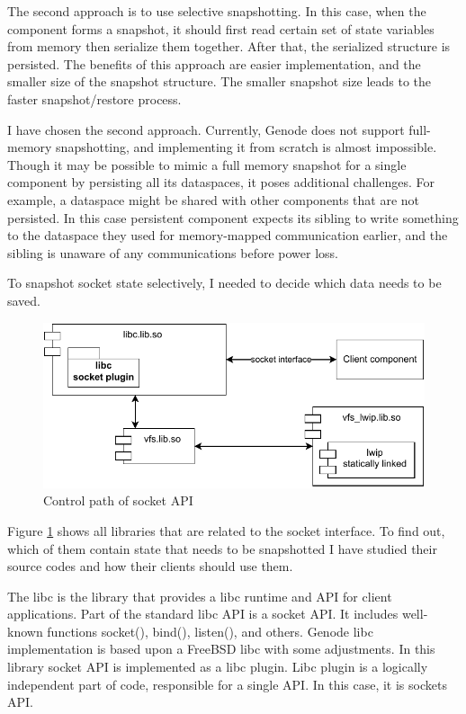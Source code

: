 The second approach is to use selective snapshotting. In this case, when the
component forms a snapshot, it should first read certain set of state variables
from memory then serialize them together. After that, the serialized structure
is persisted. The benefits of this approach are easier implementation, and the
smaller size of the snapshot structure. The smaller snapshot size leads to the faster
snapshot/restore process.

I have chosen the second approach. Currently, Genode does not support
full-memory snapshotting, and implementing it from scratch is almost
impossible. Though it may be possible to mimic a full memory snapshot for a
single component by persisting all its dataspaces, it poses additional
challenges. For example, a dataspace might be shared with other components that
are not persisted. In this case persistent component expects its sibling to
write something to the dataspace they used for memory-mapped communication
earlier, and the sibling is unaware of any communications before power loss.

To snapshot socket state selectively, I needed to decide which data needs
to be saved. 

\begin{figure}
    \centering
    \includegraphics[]{figs/vfs_components.drawio.pdf}
    \caption{Control path of socket API}
    \label{fig:socket_via_vfs}
\end{figure}

Figure \ref{fig:socket_via_vfs} shows all libraries that are related to the
socket interface. To find out, which of them contain state that needs to be
snapshotted I have studied their source codes and how their clients should use
them. 

The libc is the library that provides a libc runtime and API for client
applications. Part of the standard libc API is a socket API. It includes
well-known functions socket(), bind(), listen(), and others. Genode libc
implementation is based upon a FreeBSD libc with some adjustments. In this
library socket API is implemented as a libc plugin. Libc plugin is a logically
independent part of code, responsible for a single API. In this case, it is
sockets API.  

